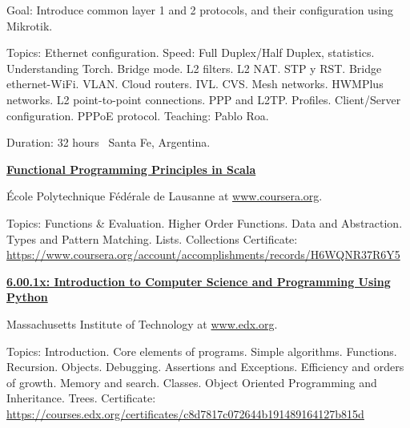 \documentclass[letterpaper,MMMyyyy,nonstop]{simpleresumecv}
\begin{document}
\begin{body}
\BulletItem Goal: Introduce common layer 1 and 2 protocols, and their configuration using Mikrotik.

\begin{detail}
	\SubBulletItem 
	Topics: Ethernet configuration. Speed: Full Duplex/Half Duplex, statistics. Understanding Torch. Bridge mode.  L2 filters. L2 NAT. STP y RST. Bridge ethernet-WiFi. VLAN. Cloud routers. IVL. CVS. Mesh networks. HWMPlus networks. L2 point-to-point connections. PPP and L2TP. Profiles. Client/Server configuration. PPPoE protocol.
	\SubBulletItem Teaching: Pablo Roa.
\end{detail}
Duration: 32 hours \SubBulletSymbol\, Santa Fe, Argentina.

\BigGap
\href{https://www.coursera.org/learn/progfun1}{\textbf{Functional Programming Principles in Scala}}
\hfill
{}

\BulletItem École Polytechnique Fédérale de Lausanne at \href{https://www.coursera.org/}{www.coursera.org}.
\begin{detail}
	\SubBulletItem
	Topics: Functions \& Evaluation. Higher Order Functions. Data and Abstraction. Types and Pattern Matching. Lists. Collections
	\SubBulletItem
	Certificate: \href{https://www.coursera.org/account/accomplishments/records/H6WQNR37R6Y5}
	{https://www.coursera.org/account/accomplishments/records/H6WQNR37R6Y5}
	
\end{detail}


\BigGap
\href{https://www.edx.org/course/introduction-to-computer-science-and-programming-using-python}{\textbf{6.00.1x: Introduction to Computer Science and Programming Using Python}}
\hfill
{}

\BulletItem Massachusetts Institute of Technology at \href{http://www.edx.org/}{www.edx.org}.
\begin{detail}
	\SubBulletItem
	Topics: Introduction. Core elements of programs. Simple algorithms. Functions. Recursion. Objects. Debugging. Assertions and Exceptions. Efficiency and orders of growth. Memory and search. Classes. Object Oriented Programming	and Inheritance. Trees.
	\SubBulletItem
	Certificate: \href{https://courses.edx.org/certificates/c8d7817c072644b191489164127b815d}
	{https://courses.edx.org/certificates/c8d7817c072644b191489164127b815d}
	

\end{detail}
\end{body}
\end{document}
